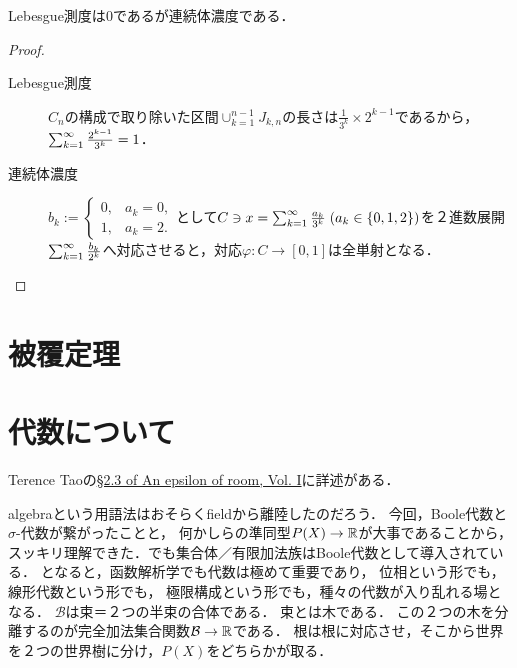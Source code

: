 \documentclass[uplatex, dvipdfmx]{jsreport}
\renewcommand{\B}{\mathcal{B}}
\begin{document}
\begin{proposition}[サイズと長さとの概念の違い]
    Lebesgue測度は$0$であるが連続体濃度である．
\end{proposition}
\begin{proof}\mbox{}
    \begin{description}
        \item[Lebesgue測度] $C_n$の構成で取り除いた区間$\cup_{k=1}^{n-1}J_{k,n}$の長さは$\frac{1}{3^k}\times 2^{k-1}$であるから，$\sum_{k=1}^\infty\frac{2^{k-1}}{3^k}=1$．
        \item[連続体濃度] $b_k:=\begin{cases}0,&a_k=0,\\1,&a_k=2.\end{cases}$として$C\ni x=\sum_{k=1}^\infty\frac{a_k}{3^k}\;(a_k\in\{0,1,2\})$を２進数展開$\sum_{k=1}^\infty\frac{b_k}{2^k}$へ対応させると，対応$\varphi:C\to[0,1]$は全単射となる．
    \end{description}
\end{proof}

\section{被覆定理}

\section{代数について}

\begin{tcolorbox}[colframe=ForestGreen, colback=ForestGreen!10!white,breakable,colbacktitle=ForestGreen!40!white,coltitle=black,fonttitle=\bfseries\sffamily,
title=]
    Terence Taoの\href{https://terrytao.files.wordpress.com/2010/02/epsilon.pdf}{§2.3 of An epsilon of room, Vol. I}に詳述がある．
\end{tcolorbox}

\begin{discussion}[algebra]
    algebraという用語法はおそらくfieldから離陸したのだろう．
    今回，Boole代数と$\sigma$-代数が繋がったことと，
    何かしらの準同型$P(X)\to\mathbb{R}$が大事であることから，
    スッキリ理解できた．\cite{Tao}でも集合体／有限加法族はBoole代数として導入されている．
    となると，函数解析学でも代数は極めて重要であり，
    位相という形でも，線形代数という形でも，
    極限構成という形でも，種々の代数が入り乱れる場となる．
    $\B$は束＝２つの半束の合体である．
    束とは木である．
    この２つの木を分離するのが完全加法集合関数$\B\to\R$である．
    根は根に対応させ，そこから世界を２つの世界樹に分け，$P(X)$をどちらかが取る．
\end{discussion}
\end{document}

